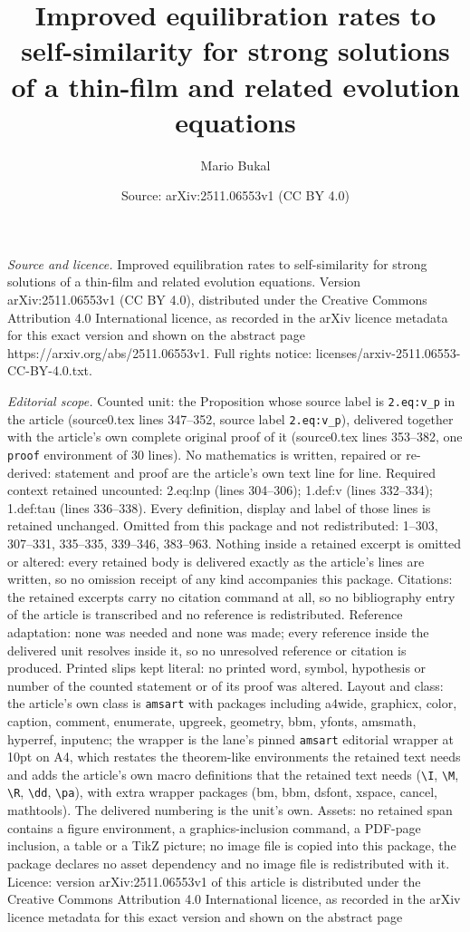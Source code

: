 \documentclass[10pt,a4paper]{amsart}
\title[Improved equilibration rates to self-similarity for strong s]{Improved equilibration rates to self-similarity for strong solutions of a thin-film and related evolution equations}
\author{Mario Bukal}
\date{Source: arXiv:2511.06553v1 (CC BY 4.0)}
\begin{document}
\maketitle

\noindent\emph{Source and licence.} Improved equilibration rates to self-similarity for strong solutions of a thin-film and related evolution equations. Version arXiv:2511.06553v1 (CC BY 4.0), distributed under the Creative Commons Attribution 4.0 International licence, as recorded in the arXiv licence metadata for this exact version and shown on the abstract page https://arxiv.org/abs/2511.06553v1. Full rights notice: licenses/arxiv-2511.06553-CC-BY-4.0.txt.\par\smallskip

\noindent\textit{Editorial scope.} Counted unit: the Proposition whose source label is \texttt{2.eq:v\_p} in the article (source0.tex lines 347--352, source label \texttt{2.eq:v\_p}), delivered together with the article's own complete original proof of it (source0.tex lines 353--382, one \texttt{proof} environment of 30 lines). No mathematics is written, repaired or re-derived: statement and proof are the article's own text line for line. Required context retained uncounted: 2.eq:lnp (lines 304--306); 1.def:v (lines 332--334); 1.def:tau (lines 336--338). Every definition, display and label of those lines is retained unchanged. Omitted from this package and not redistributed: 1--303, 307--331, 335--335, 339--346, 383--963. Nothing inside a retained excerpt is omitted or altered: every retained body is delivered exactly as the article's lines are written, so no omission receipt of any kind accompanies this package. Citations: the retained excerpts carry no citation command at all, so no bibliography entry of the article is transcribed and no reference is redistributed. Reference adaptation: none was needed and none was made; every reference inside the delivered unit resolves inside it, so no unresolved reference or citation is produced. Printed slips kept literal: no printed word, symbol, hypothesis or number of the counted statement or of its proof was altered. Layout and class: the article's own class is \texttt{amsart} with packages including a4wide, graphicx, color, caption, comment, enumerate, upgreek, geometry, bbm, yfonts, amsmath, hyperref, inputenc; the wrapper is the lane's pinned \texttt{amsart} editorial wrapper at 10pt on A4, which restates the theorem-like environments the retained text needs and adds the article's own macro definitions that the retained text needs (\texttt{\textbackslash I}, \texttt{\textbackslash M}, \texttt{\textbackslash R}, \texttt{\textbackslash dd}, \texttt{\textbackslash pa}), with extra wrapper packages (bm, bbm, dsfont, xspace, cancel, mathtools). The delivered numbering is the unit's own. Assets: no retained span contains a figure environment, a graphics-inclusion command, a PDF-page inclusion, a table or a TikZ picture; no image file is copied into this package, the package declares no asset dependency and no image file is redistributed with it. Licence: version arXiv:2511.06553v1 of this article is distributed under the Creative Commons Attribution 4.0 International licence, as recorded in the arXiv licence metadata for this exact version and shown on the abstract page 
\end{document}
